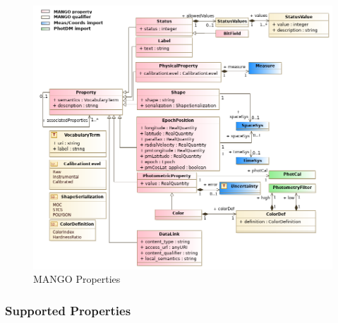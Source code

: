 \documentclass[11pt,a4paper]{ivoa}
\begin{document}
      \begin{figure}[h]
        \includegraphics[width=1.0\textwidth]{../model/property.png}
        \caption{MANGO Properties}
        \label{fig:property}
      \end{figure}

\subsubsection{Supported Properties}
\end{document}
